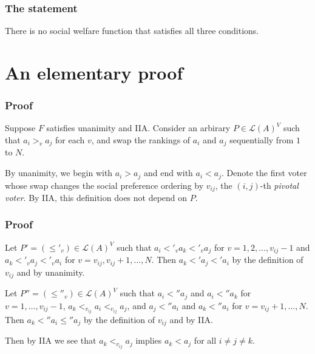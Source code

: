 \documentclass{beamer}
\theoremstyle{definition}
\begin{document}
\begin{frame}
    \frametitle{The statement}

    \begin{theorem}
        There is no social welfare function that satisfies all three conditions.
    \end{theorem}

\end{frame}

\section{An elementary proof}

\begin{frame}
    \frametitle{Proof}

    Suppose $F$ satisfies unanimity and IIA.
    \pause
    Consider an arbirary $P \in \mathcal{L}(A)^V$ such that $a_i >_v a_j$ for each $v$, and swap the rankings of $a_i$ and $a_j$
    sequentially from $1$ to $N$.

    \pause
    By unanimity, we begin with $a_i > a_j$ and end with $a_i < a_j$.
    \pause
    Denote the first voter whose swap changes the social preference ordering by $v_{ij}$, the $(i,j)$-th \emph{pivotal voter}.
    By IIA, this definition does not depend on $P$.
\end{frame}

\begin{frame}
    \frametitle{Proof}

    Let $P' = (\leq'_v) \in \mathcal{L}(A)^V$ such that $a_i <'_v a_k <'_v a_j$ for $v = 1, 2, \dots, v_{ij} - 1$ and
    $a_k <'_v a_j <'_v a_i$ for $v = v_{ij}, v_{ij} + 1, \dots, N$.
    \pause
    Then $a_k <' a_j <' a_i$ by the definition of $v_{ij}$ and by unanimity.

    \pause
    Let $P'' = (\leq''_v) \in \mathcal{L}(A)^V$ such that $a_i <'' a_j$ and $a_i <'' a_k$ for $v = 1, \dots, v_{ij} - 1$,
    $a_k <_{v_{ij}} a_i <_{v_{ij}} a_j$, and $a_j <'' a_i$ and $a_k <'' a_i$ for $v = v_{ij} + 1, \dots, N$.
    \pause
    Then $a_k  <'' a_i \leq'' a_j$ by the definition of $v_{ij}$ and by IIA.

    \pause
    Then by IIA we see that $a_k <_{v_{ij}} a_j$ implies $a_k < a_j$ for all $i \neq j \neq k$.
\end{frame}
\end{document}
